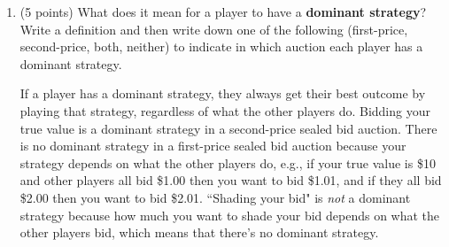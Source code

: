 \documentclass[twoside]{article}
\newcommand{\mybigskip}{\vspace{1in}}
\newcommand{\mybiggerskip}{\vspace{1.5in}}
\begin{document}
\begin{enumerate}
\begin{enumerate}




    \item \begin{EXAM} (5 points) What does it mean for a player to have a \textbf{dominant strategy}? Write a definition and then write down one of the following (first-price, second-price, both, neither) to indicate in which auction each player has a dominant strategy.  \end{EXAM}

\begin{KEY}
If a player has a dominant strategy, they always get their best outcome by playing that strategy, regardless of what the other players do. Bidding your true value is a dominant strategy in a second-price sealed bid auction. There is no dominant strategy in a first-price sealed bid auction because your strategy depends on what the other players do, e.g., if your true value is \$10 and other players all bid \$1.00 then you want to bid \$1.01, and if they all bid \$2.00 then you want to bid \$2.01. ``Shading your bid" is \emph{not} a dominant strategy because how much you want to shade your bid depends on what the other players bid, which means that there's no dominant strategy. 
\end{KEY}

\begin{comment}
    \item \begin{EXAM} (5 points) \enlargethispage{1\baselineskip} Your friend Ed needs some cash, so he decides to auction off his prized collection of *NSYNC bobblehead dolls. You suggest a second-price sealed bid auction, to which he says, ``Second price? Why should I accept the \emph{second-highest} price when I can do a first-price sealed bid auction and get the \emph{first-highest} price?" Write a response. \emph{Hint: }Think about your answers to the first two auction questions above. \mybiggerskip\end{EXAM}


\end{comment}
\end{enumerate}
\end{enumerate}
\end{document}
